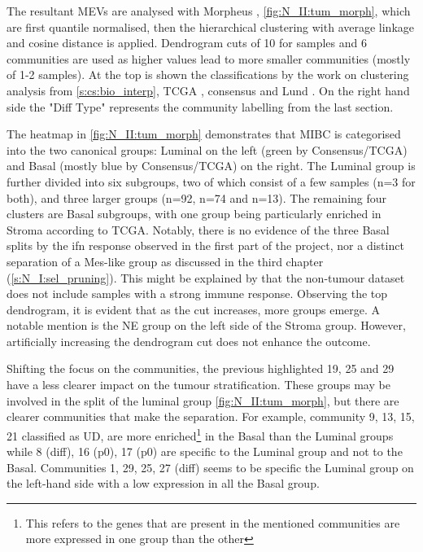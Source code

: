 The resultant MEVs are analysed with Morpheus \citep{Broad-InstituteUnknown-kn}, \cref{fig:N_II:tum_morph}, which are first quantile normalised, then the hierarchical clustering with average linkage and cosine distance is applied. Dendrogram cuts of 10 for samples and 6 communities are used as higher values lead to more smaller communities (mostly of 1-2 samples). At the top is shown the classifications by the work on clustering analysis from \cref{s:cs:bio_interp}, TCGA \citep{Robertson2017-mg}, consensus \citep{Kamoun2020-tj} and Lund \citep{Marzouka2018-ge}. On the right hand side the "Diff Type" represents the community labelling from the last section.

The heatmap in \cref{fig:N_II:tum_morph} demonstrates that MIBC is categorised into the two canonical groups: Luminal on the left (green by Consensus/TCGA) and Basal (mostly blue by Consensus/TCGA) on the right. The Luminal group is further divided into six subgroups, two of which consist of a few samples (n=3 for both), and three larger groups (n=92, n=74 and n=13). The remaining four clusters are Basal subgroups, with one group being particularly enriched in Stroma according to TCGA. Notably, there is no evidence of the three Basal splits by the \acrfull{ifn} response observed in the first part of the project, nor a distinct separation of a Mes-like group as discussed in the third chapter (\cref{s:N_I:sel_pruning}). This might be explained by that the non-tumour dataset does not include samples with a strong immune response. Observing the top dendrogram, it is evident that as the cut increases, more groups emerge. A notable mention is the NE group on the left side of the Stroma group. However, artificially increasing the dendrogram cut does not enhance the outcome.

Shifting the focus on the communities, the previous highlighted 19, 25 and 29 have a less clearer impact on the tumour stratification. These groups may be involved in the split of the luminal group \cref{fig:N_II:tum_morph}, but there are clearer communities that make the separation. For example, community 9, 13, 15, 21 classified as UD, are more enriched\footnote{This refers to the genes that are present in the mentioned communities are more expressed in one group than the other} in the Basal than the Luminal groups while 8 (diff), 16 (p0), 17 (p0) are specific to the Luminal group and not to the Basal. Communities 1, 29, 25, 27 (diff) seems to be specific the Luminal group on the left-hand side with a low expression in all the Basal group. 

